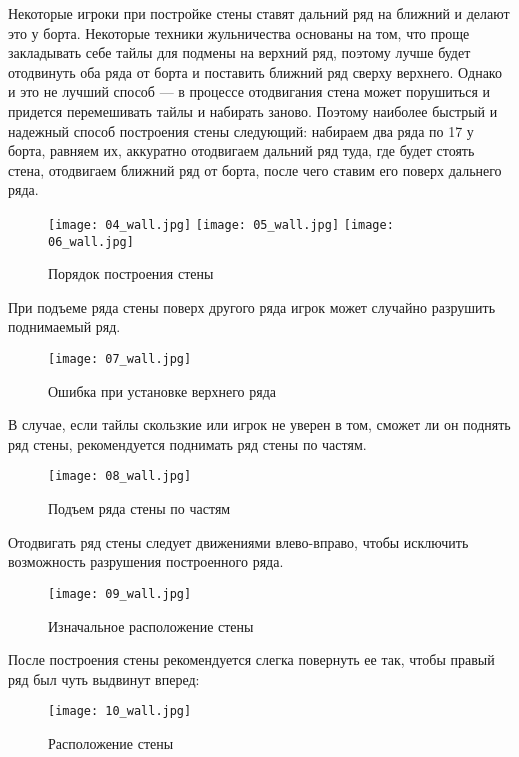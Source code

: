 Некоторые игроки при постройке стены ставят дальний ряд на ближний и делают это у борта. Некоторые техники жульничества основаны на том, что проще закладывать себе тайлы для подмены на верхний ряд, поэтому лучше будет отодвинуть оба ряда от борта и поставить ближний ряд сверху верхнего. Однако и это не лучший способ --- в процессе отодвигания стена может порушиться и придется перемешивать тайлы и набирать заново. Поэтому наиболее быстрый и надежный способ построения стены следующий: набираем два ряда по 17 у борта, равняем их, аккуратно отодвигаем дальний ряд туда, где будет стоять стена, отодвигаем ближний ряд от борта, после чего ставим его поверх дальнего ряда. 

\begin{figure}[H]
	\centering
	\texttt{[image: 04\_wall.jpg]}
	\texttt{[image: 05\_wall.jpg]}
	\texttt{[image: 06\_wall.jpg]}
	\caption{Порядок построения стены}
\end{figure}

При подъеме ряда стены поверх другого ряда игрок может случайно разрушить поднимаемый ряд. 

\begin{figure}[H]
	\centering
	\texttt{[image: 07\_wall.jpg]}
	\caption{Ошибка при установке верхнего ряда}
\end{figure}

В случае, если тайлы скользкие или игрок не уверен в том, сможет ли он поднять ряд стены, рекомендуется поднимать ряд стены по частям.

\begin{figure}[H]
	\centering
	\texttt{[image: 08\_wall.jpg]}
	\caption{Подъем ряда стены по частям}
\end{figure}

Отодвигать ряд стены следует движениями влево-вправо, чтобы исключить возможность разрушения построенного ряда.

\begin{figure}[H]
	\centering
	\texttt{[image: 09\_wall.jpg]}
	\caption{Изначальное расположение стены}
\end{figure}

После построения стены рекомендуется слегка повернуть ее так, чтобы правый ряд был чуть выдвинут вперед:

\begin{figure}[H]
	\centering
	\texttt{[image: 10\_wall.jpg]}
	\caption{Расположение стены}
\end{figure}

